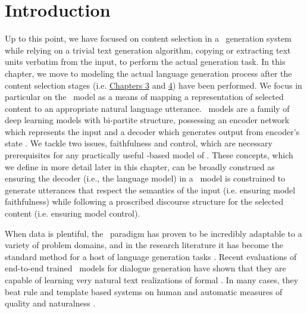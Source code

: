 \section{Introduction}

Up to this point, we have  focused on content selection in a
\texttotext~generation system while relying on a trivial text generation
algorithm, copying or extracting text units verbatim from the input, to
perform the actual generation task.  In this chapter, we move to modeling the
actual language generation process after the content selection stages (i.e.
\hyperref[dlsal]{Chapters 3} and \hyperref[mlsal]{4}) have been performed.  We
focus in particular on the \sequencetosequence~model as a means of mapping a
representation of selected content to an appropriate natural language
utterance. \Sequencetosequence~models are a family of deep learning models
with bi-partite structure, possessing an encoder network which represents the
input and a decoder which generates output from encoder's state
\citep{sutskever2014}.  We tackle two issues, faithfulness and control, which
are necessary prerequisites for any practically useful
\sequencetosequence-based model of \naturallanguagegeneration.  These
concepts, which we define in more detail later in this chapter, can be
broadly construed as ensuring the decoder (i.e., the language model) in a
\sequencetosequence~model is constrained to generate utterances that respect
the semantics of the input (i.e. ensuring model faithfulness) 
while following a proscribed
discourse structure for the selected content (i.e. ensuring model control).

When data is
plentiful, the \sequencetosequence~paradigm has proven to be
incredibly adaptable to a variety of problem domains, and in the research
literature it 
has become the standard method for a 
host of language generation tasks \citep{xu2015,dusek2016,vaswani2017,fan2018}.
  Recent evaluations of
end-to-end trained \sequencetosequence~models for dialogue generation have 
shown that they are capable of learning very natural text realizations of 
formal
\meaningrepresentation. In many cases, they  beat
rule and template based systems on human and automatic measures of quality
and naturalness 
\citep{dusek2020}.
 



